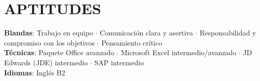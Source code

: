 \documentclass[letterpaper,11pt]{article}
\begin{document}
\section{APTITUDES}
 \begin{itemize}[leftmargin=0in, label={}]
    \small{\item{
     \textbf{Blandas}{: Trabajo en equipo $\cdot$ Comunicación clara y asertiva $\cdot$ Responsabilidad y compromiso con los objetivos $\cdot$ Pensamiento crítico}\vspace{4pt} \\
     \textbf{Técnicas}{: Paquete Office avanzado $\cdot$ Microsoft Excel intermedio/avanzado $\cdot$ JD Edwards (JDE) intermedio $\cdot$ SAP intermedio}\vspace{4pt} \\
     \textbf{Idiomas}{: Inglés B2}
    }}
 \end{itemize}

\end{document}
